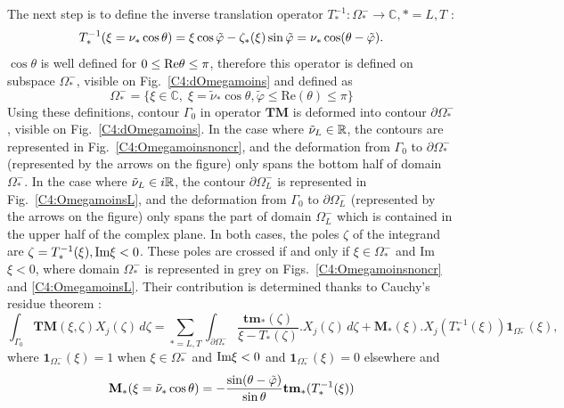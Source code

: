 The next step is to define the inverse translation operator $T_*^{-1}:\Omega_*^-\rightarrow\mathbb{C}, *=L,T$ :
\begin{equation}
T_*^{-1}(\xi=\nu_*\cos\theta)=\xi \cos \tilde{\varphi}-\zeta_*(\xi)\sin\tilde{\varphi}=\nu_*\cos(\theta-\tilde{\varphi}).
\end{equation}
$\cos\theta$ is well defined for $0\leq\rm Re \theta\leq \pi$, therefore this operator is defined on subspace $\Omega_*^-$, visible on Fig.~\ref{C4:dOmegamoins} and defined as 
\begin{equation}
\Omega_*^-=\{ \xi \in \mathbb{C}, \; \xi=\tilde{\nu}_* \cos \theta,  \tilde{\varphi}\leq\mbox{Re}(\theta)\leq\pi \}
\end{equation}
Using these definitions, contour $\Gamma_0$ in operator $\mathbf{TM}$ is deformed into contour $\partial \Omega_*^-$, visible on Fig.~\ref{C4:dOmegamoins}. In the case where $\tilde{\nu}_L \in \mathbb{R}$, the contours are represented in Fig.~\ref{C4:Omegamoinsnoncr}, and the deformation from $\Gamma_0$ to $\partial \Omega_*^-$ (represented by the arrows on the figure) only spans the  bottom half of domain $\Omega_*^-$. In the case where $\tilde{\nu}_L \in i\mathbb{R}$, the contour $\partial \Omega_L^-$ is represented in Fig.~\ref{C4:OmegamoinsL}, and the deformation from $\Gamma_0$ to $\partial \Omega_L^-$ (represented by the arrows on the figure) only spans the part of domain $\Omega_L^-$ which is contained in the upper half of the complex plane. In both cases, the poles $\zeta$ of the integrand are $\zeta=T_*^{-1}(\xi), \rm Im \xi <0$. These poles are crossed if and only if $\xi \in \Omega_*^-$ and Im$\xi<0$, where domain $\Omega_*^-$ is represented in grey on Figs.~\ref{C4:Omegamoinsnoncr} and \ref{C4:OmegamoinsL}. Their contribution is determined thanks to Cauchy's residue theorem :
\begin{equation}
\int_{\Gamma_0} \textbf{TM}(\xi,\zeta)X_j(\zeta)\, d\zeta = \sum_{*=L,T}\int_{\partial \Omega_*^-}  \dfrac{\textbf{tm}_*(\zeta)}{\xi-T_*(\zeta)}.X_j(\zeta)\, d\zeta+ \mathbf{M}_*(\xi).X_j(T^{-1}_*(\xi))\textbf{1}_{\Omega_*^-}(\xi),
\label{C4:TM2}
\end{equation}
where $\textbf{1}_{\Omega_*^-}(\xi)=1$ when $\xi \in \Omega_*^-$ and $\rm Im \xi<0$ and $\textbf{1}_{\Omega_*^-}(\xi)=0$ elsewhere and
\begin{equation}
\mathbf{M}_*(\xi=\tilde{\nu}_*\cos\theta)=-\frac{\sin(\theta-\tilde{\varphi})}{\sin\theta} \textbf{tm}_*(T_*^{-1}(\xi))
\end{equation}
 
